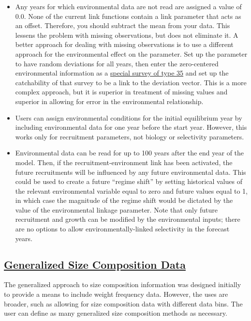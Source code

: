 	\begin{itemize}
		\item Any years for which environmental data are not read are assigned a value of 0.0. None of the current link functions contain a link parameter that acts as an offset. Therefore, you should subtract the mean from your data. This lessens the problem with missing observations, but does not eliminate it. A better approach for dealing with missing observations is to use a different approach for the environmental effect on the parameter. Set up the parameter to have random deviations for all years, then enter the zero-centered environmental information as a \hyperlink{SpecialSurvey}{special survey of type 35} and set up the catchability of that survey to be a link to the deviation vector. This is a more complex approach, but it is superior in treatment of missing values and superior in allowing for error in the environmental relationship.
		\item Users can assign environmental conditions for the initial equilibrium year by including environmental data for one year before the start year. However, this works only for recruitment parameters, not biology or selectivity parameters.
		\item Environmental data can be read for up to 100 years after the end year of the model. Then, if the recruitment-environment link has been activated, the future recruitments will be influenced by any future environmental data. This could be used to create a future ``regime shift'' by setting historical values of the relevant environmental variable equal to zero and future values equal to 1, in which case the magnitude of the regime shift would be dictated by the value of the environmental linkage parameter. Note that only future recruitment and growth can be modified by the environmental inputs; there are no options to allow environmentally-linked selectivity in the forecast years.
	\end{itemize}

\hypertarget{GenSizeComp}{}
\subsection[Generalized Size Composition Data]{\protect\hyperlink{GenSizeComp}{Generalized Size Composition Data}}
The generalized approach to size composition information was designed initially to provide a means to include weight frequency data. However, the uses are broader, such as allowing for size composition data with different data bins. The user can define as many generalized size composition methods as necessary.

